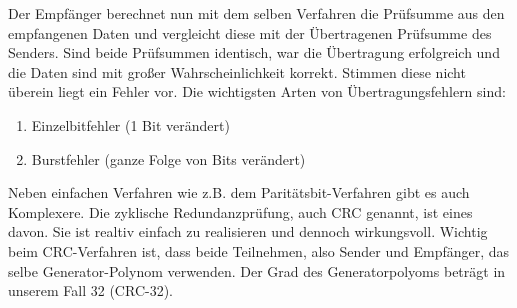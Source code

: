 Der Empfänger berechnet nun mit dem selben Verfahren die Prüfsumme aus den empfangenen Daten und vergleicht diese mit der Übertragenen Prüfsumme des Senders.
Sind beide Prüfsummen identisch, war die Übertragung erfolgreich und die Daten sind mit großer Wahrscheinlichkeit korrekt.
Stimmen diese nicht überein liegt ein Fehler vor.
Die wichtigsten Arten von Übertragungsfehlern sind:
\begin{enumerate}
    \item Einzelbitfehler (1 Bit verändert)
    \item Burstfehler (ganze Folge von Bits verändert)
\end{enumerate}
Neben einfachen Verfahren wie z.B. dem Paritätsbit-Verfahren gibt es auch Komplexere.
Die zyklische Redundanzprüfung, auch CRC genannt, ist eines davon.
Sie ist realtiv einfach zu realisieren und dennoch wirkungsvoll.
Wichtig beim CRC-Verfahren ist, dass beide Teilnehmen, also Sender und Empfänger, das selbe Generator-Polynom verwenden.
Der Grad des Generatorpolyoms beträgt in unserem Fall 32 (CRC-32).
